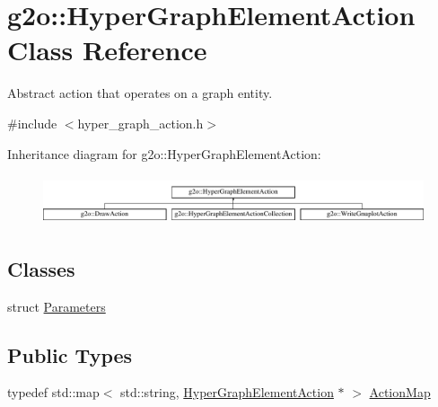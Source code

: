 \hypertarget{classg2o_1_1_hyper_graph_element_action}{}\section{g2o\+:\+:Hyper\+Graph\+Element\+Action Class Reference}
\label{classg2o_1_1_hyper_graph_element_action}


Abstract action that operates on a graph entity.  




{\ttfamily \#include $<$hyper\+\_\+graph\+\_\+action.\+h$>$}

Inheritance diagram for g2o\+:\+:Hyper\+Graph\+Element\+Action\+:\begin{figure}[H]
\begin{center}
\leavevmode
\includegraphics[height=1.475626cm]{classg2o_1_1_hyper_graph_element_action}
\end{center}
\end{figure}
\subsection*{Classes}
\begin{DoxyCompactItemize}
\item 
struct \mbox{\hyperlink{structg2o_1_1_hyper_graph_element_action_1_1_parameters}{Parameters}}
\end{DoxyCompactItemize}
\subsection*{Public Types}
\begin{DoxyCompactItemize}
\item 
typedef std\+::map$<$ std\+::string, \mbox{\hyperlink{classg2o_1_1_hyper_graph_element_action}{Hyper\+Graph\+Element\+Action}} $\ast$ $>$ \mbox{\hyperlink{classg2o_1_1_hyper_graph_element_action_abc889fc90ae1bbb63d90c7993777417a}{Action\+Map}}
\end{DoxyCompactItemize}

